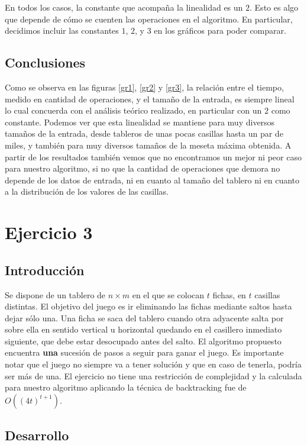\documentclass[10pt, a4paper,english,spanish]{article}
\begin{document}
En todos los casos, la constante que acompaña la linealidad es un $2$. Esto es algo que depende de cómo se cuenten las operaciones en el
algoritmo. En particular, decidimos incluir las constantes $1$, $2$, y $3$ en los gráficos para poder comparar.

\subsection{Conclusiones}
\indent Como se observa en las figuras \ref{gr1}, \ref{gr2} y \ref{gr3}, la relación entre el tiempo, medido en cantidad de operaciones, 
y el tamaño de la entrada, es siempre lineal lo cual concuerda con el análisis teórico realizado, en particular con un $2$ como constante.
Podemos ver que esta linealidad se mantiene para muy diversos 
tamaños de la entrada, desde tableros de unas pocas casillas hasta un par de miles, y también para muy diversos tamaños de la 
meseta máxima obtenida. A partir de los resultados también vemos que no encontramos un mejor ni peor caso para nuestro algoritmo, 
si no que la cantidad de operaciones que demora no depende de los datos de entrada, ni en cuanto al tamaño del tablero ni en cuanto a 
la distribución de los valores de las casillas.


\newpage

\section{Ejercicio 3}

\subsection{Introducción}

Se dispone de un tablero de $n \times m$ en el que se colocan $t$ fichas, en $t$ casillas distintas. El objetivo del juego es ir
eliminando las fichas mediante saltos hasta dejar sólo una. Una ficha se saca del tablero cuando otra adyacente salta por sobre ella 
en sentido vertical u horizontal quedando en el casillero inmediato siguiente, que debe estar desocupado antes del salto.
El algoritmo propuesto encuentra \textbf{una} sucesión de pasos a seguir para ganar el juego. Es importante notar que el juego
no siempre va a tener solución y que en caso de tenerla, podría ser más de una. El ejercicio no tiene una restricción de complejidad
y la calculada para nuestro algoritmo aplicando la técnica de backtracking fue de $O((4t)^{t+1})$.

\subsection{Desarrollo}
\end{document}
